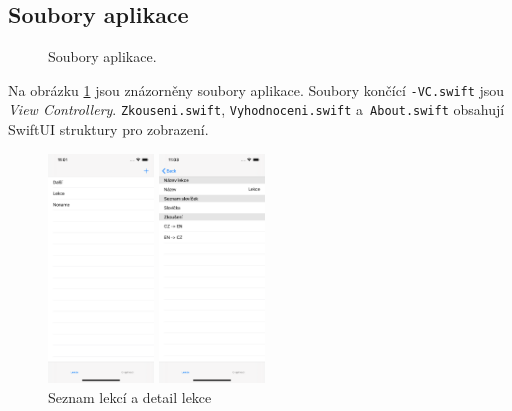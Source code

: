 \documentclass[10pt, a4paper]{article}
\begin{document}
\subsection{Soubory aplikace}

\begin{figure}


\caption{Soubory aplikace.}\label{files}


\end{figure}

Na obrázku \ref{files} jsou znázorněny soubory aplikace. Soubory končící \verb|-VC.swift| jsou \emph{View Controllery}. \verb|Zkouseni.swift|, \verb|Vyhodnoceni.swift| a~\verb|About.swift| obsahují SwiftUI struktury pro zobrazení.

\begin{figure}
\begin{center}
\begin{multicols}{2}

\includegraphics[width=0.25\textwidth]{img/lekce.png} \par
\includegraphics[width=0.25\textwidth]{img/lekce-detail.png} \par

\end{multicols}
\caption{Seznam lekcí a detail lekce} \label{lekce} 
\end{center}
\end{figure}
\end{document}
